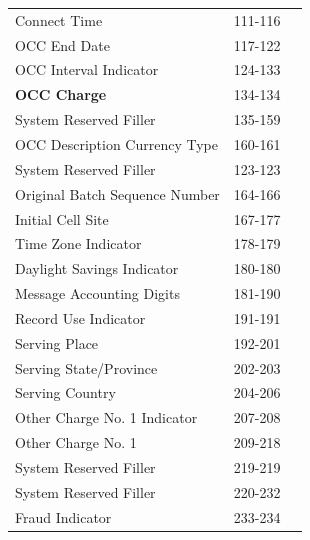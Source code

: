 \documentclass[12pt,twoside]{article}
\begin{document}
\begin{longtable}{lrr}
 Connect Time                         &            111-116  &                        \\
 OCC End Date                         &            117-122  &                        \\
 OCC Interval Indicator               &            124-133  &                        \\
 \textbf{OCC Charge}                  &            134-134  &                        \\
 System Reserved Filler               &            135-159  &                        \\
 OCC Description Currency Type        &            160-161  &                        \\
 System Reserved Filler               &            123-123  &                        \\
 Original Batch Sequence Number       &            164-166  &                        \\
 Initial Cell Site                    &            167-177  &                        \\
 Time Zone Indicator                  &            178-179  &                        \\
 Daylight Savings Indicator           &            180-180  &                        \\
 Message Accounting Digits            &            181-190  &                        \\
 Record Use Indicator                 &            191-191  &                        \\
 Serving Place                        &            192-201  &                        \\
 Serving State/Province               &            202-203  &                        \\
 Serving Country                      &            204-206  &                        \\
 Other Charge No. 1 Indicator         &            207-208  &                        \\
 Other Charge No. 1                   &            209-218  &                        \\
 System Reserved Filler               &            219-219  &                        \\
 System Reserved Filler               &            220-232  &                        \\
 Fraud Indicator                      &            233-234  &                        \\

\end{longtable}
\end{document}

